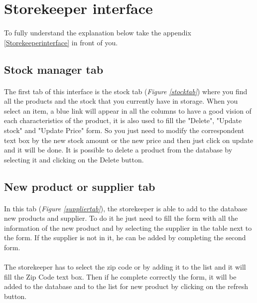 \documentclass[12pt,oneside]{report}
\begin{document}
\newpage
\section{Storekeeper interface}
    \paragraph{}
    To fully understand the explanation below take the appendix \ref{Storekeeperinterface} in front of you.
   
    \subsection{Stock manager tab}
        \paragraph{}
        The first tab of this interface is the stock tab (\textit{Figure \ref{stocktab}}) where you find all the products and the stock that you currently have in storage. When you select an item, a blue link will appear in all the columns to have a good vision of each characteristics of the product, it is also used to fill the "Delete", "Update stock" and "Update Price" form. So you just need to modify the correspondent text box  by the new stock amount or the new price and then just click on update and it will be done. It is possible to delete a product from the database by selecting it and clicking on the Delete button.
    \vspace{\baselineskip}
        
    \subsection{New product or supplier tab}
        \paragraph{}
        In this tab (\textit{Figure \ref{suppliertab}}), the storekeeper is able to add to the database new products and supplier. To do it he just need to fill the form with all the information of the new product and by selecting the supplier in the table next to the form. If the supplier is not in it, he can be added by completing the second form.
        
        \paragraph{}
        The storekeeper has to select the zip code or by adding it to the list and it will fill the Zip Code text box. Then if he complete correctly the form, it will be added to the database and to the list for new product by clicking on the refresh button.
	\vspace{\baselineskip}
    \vspace{\baselineskip}
    
\end{document}
